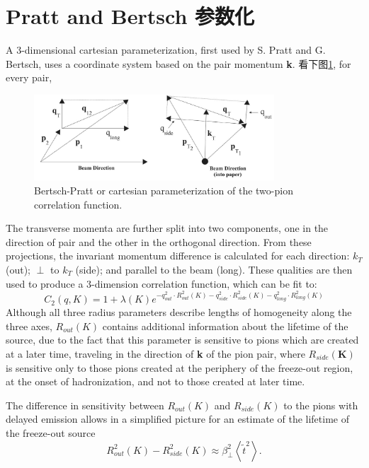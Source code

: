 \section{Pratt and Bertsch 参数化}
A 3-dimensional cartesian parameterization, first used by S. Pratt and G. Bertsch,%
uses a coordinate system based on the pair momentum \textbf{k}.%
看下图\ref{fig:pratt-coordinate}, for every pair,%
\begin{figure}[hbpt]
  \centering
  \includegraphics[width=0.8\textwidth]{./chapter06/images/pratt-coordinate}
  \caption{Bertsch-Pratt or cartesian parameterization of the two-pion correlation function.}
  \label{fig:pratt-coordinate}
\end{figure}
The transverse momenta are further split into two components,%
one in the direction of pair and the other in the orthogonal direction.%
From these projections, the invariant momentum difference is calculated for each direction:%
$k_{T}$ (out); $\perp$ to $k_{T}$ (side); and parallel to the beam (long).%
These qualities are then used to produce a 3-dimension correlation function,%
which can be fit to:
\begin{equation}
  \label{eq:chapterSix23}
  C_{2}(q, K) = 1 + \lambda(K)e^{-q_{out}^{2}\cdot R_{out}^{2}(K)-q_{side}^{2}\cdot R_{side}^{2}(K)-q_{long}^{2}\cdot R_{long}^{2}(K)}
\end{equation}
Although all three radius parameters describe lengths of homogeneity along the three axes,%
$R_{out}(K)$ contains additional information about the lifetime of the source,%
due to the fact that this parameter is sensitive to pions which are created at a later time,%
traveling in the direction of \textbf{k} of the pion pair,%
where $R_{side}(\textbf{K})$ is sensitive only to those pions created at the periphery of the freeze-out region,%
at the onset of hadronization, and not to those created at later time.
\par
The difference in sensitivity between $R_{out}(K)$ and $R_{side}(K)$ to the pions with delayed emission allows
in a simplified picture for an estimate of the lifetime of the freeze-out source
\begin{equation}
  \label{eq:chapterSix24}
  R_{out}^{2}(K) - R_{side}^{2}(K) \approx \beta_{\perp}^{2}\left< \widetilde{t}^{2}\right>.
\end{equation}
